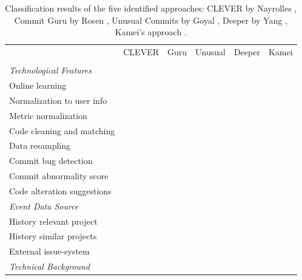
\begin{table}[p]
	\centering
	\caption{Classification results of the five identified approaches: CLEVER by Nayrolles \cite{Nayrolles2018}, Commit Guru by Rosen \cite{Rosen2015}, Unusual Commits by Goyal \cite{Goyal2017}, Deeper by Yang \cite{Yang2015}, Kamei's approach \cite{Kamei2013}.}
	\begin{tabular}{@{}lccccc@{}}
		\toprule
		& CLEVER & Guru & Unusual & Deeper & Kamei \\ 
		& \cite{Nayrolles2018} & \cite{Rosen2015} & \cite{Goyal2017} & \cite{Yang2015} & \cite{Kamei2013} \\ \midrule
		\textit{Technological Features} & & & & & \\ 
		Online learning & \pointyes & \pointyes & \pointyes & \pointyes & \pointno \\
		Normalization to user info & \pointno & \pointno & \pointyes & \pointno & \pointno \\
		Metric normalization & \pnotapplicable & \pnotapplicable & \pointyes & \pointyes & \pointyes \\
		Code cleaning and matching & \pointyes & \pointno & \pointno & \pointno & \pointno \\
		Data resampling & \pnotapplicable & \pnotapplicable & \pointno & \pointyes & \pointyes \\
		Commit bug detection & \pointyes & \pointyes & \pointno & \pointyes & \pointyes \\
		Commit abnormality score & \pointno & \pointno & \pointyes & \pointno & \pointno \\
		Code alteration suggestions & \pointyes & \pointno & \pointno & \pointno & \pointno \\ \midrule
		\textit{Event Data Source} & & & & & \\
		History relevant project & \pointyes & \pointyes & \pointyes & \pointyes & \pointyes \\
		History similar projects & \pointyes & \pointno & \pointno & \pointno & \pointno \\
		External issue-system & \pointyes & \pointno & \pointno & \pointyes & \pointyes \\ \midrule
		\textit{Technical Background} & & & & & \\

\end{tabular}
\end{table}
